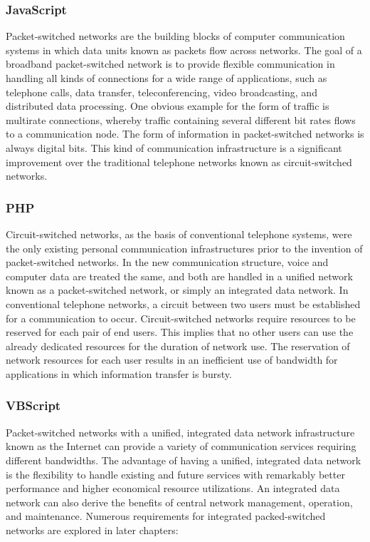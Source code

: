 \subsubsection{JavaScript}
Packet-switched networks are the building blocks of computer communication systems in which data units known as packets flow across networks. The goal of a broadband packet-switched network is to provide flexible communication in handling all kinds of connections for a wide range of applications, such as telephone calls, data transfer, teleconferencing, video broadcasting, and distributed data processing. One obvious example for the form of traffic is multirate connections, whereby traffic containing several different bit rates flows to a communication node. The form of information in packet-switched networks is always digital bits. This kind of communication infrastructure is a significant improvement over the traditional telephone networks known as circuit-switched networks.
\subsubsection{PHP}
Circuit-switched networks, as the basis of conventional telephone systems, were the only existing personal communication infrastructures prior to the invention of packet-switched networks. In the new communication structure, voice and computer data are treated the same, and both are handled in a unified network known as a packet-switched network, or simply an integrated data network. In conventional telephone networks, a circuit between two users must be established for a communication to occur. Circuit-switched networks require resources to be reserved for each pair of end users. This implies that no other users can use the already dedicated resources for the duration of network use. The reservation of network resources for each user results in an inefficient use of bandwidth for applications in which information transfer is bursty.


\subsubsection{VBScript}
Packet-switched networks with a unified, integrated data network infrastructure known as the Internet can provide a variety of communication services requiring different bandwidths. The advantage of having a unified, integrated data network is the flexibility to handle existing and future services with remarkably better performance and higher economical resource utilizations. An integrated data network can also derive the benefits of central network management, operation, and maintenance. Numerous requirements for integrated packed-switched networks are explored in later chapters:

